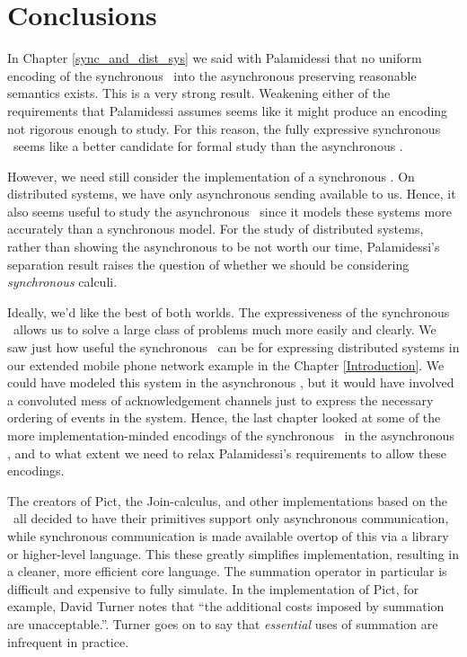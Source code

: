 \chapter{Conclusions}
In Chapter \ref{sync_and_dist_sys} we said with Palamidessi that no uniform encoding of the synchronous \picalc\ into the asynchronous \picalc preserving reasonable semantics exists.  This is a very strong result.  Weakening either of the requirements that Palamidessi assumes seems like it might produce an encoding not rigorous enough to study.  
For this reason, the fully expressive synchronous \picalc\ seems like a better candidate for formal study than the asynchronous \picalc.

However, we need still consider the implementation of a synchronous \picalc.  
On distributed systems, we have only asynchronous sending available to us.  
Hence, it also seems useful to study the asynchronous \picalc\ since it models these systems more accurately than a synchronous model.
For the study of distributed systems, rather than showing the asynchronous to be not worth our time, Palamidessi's separation result raises the question of whether we should be considering \emph{synchronous} calculi. 

Ideally, we'd like the best of both worlds.  The expressiveness of the synchronous \picalc\ allows us to solve a large class of problems much more easily and clearly.
We saw just how useful the synchronous \picalc\ can be for expressing distributed systems in our extended mobile phone network example in the Chapter \ref{Introduction}.
We could have modeled this system in the asynchronous \picalc, but it would have involved a convoluted mess of acknowledgement channels just to express the necessary ordering of events in the system.
Hence, the last chapter looked at some of the more implementation-minded encodings of the synchronous \picalc\ in the asynchronous \picalc, and to what extent we need to relax Palamidessi's requirements to allow these encodings.

The creators of Pict, the Join-calculus, and other implementations based on the \picalc\ all decided to have their primitives support only asynchronous communication, while synchronous communication is made available overtop of this via a library or higher-level language.  
This these greatly simplifies implementation, resulting in a cleaner, more efficient core language.  
The summation operator in particular is difficult and expensive to fully simulate.  
In the implementation of Pict, for example, David Turner notes \cite{turn96} that ``the additional costs imposed by summation are unacceptable.''.  
Turner goes on to say that \emph{essential} uses of summation are infrequent in practice.

